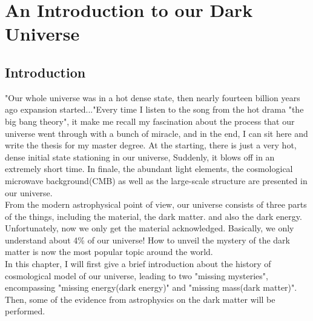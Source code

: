 \chapter{An Introduction to our Dark Universe}

\section{Introduction}
"Our whole universe was in a hot dense state,
then nearly fourteen billion years ago expansion started..."Every time I listen to the song from the hot drama "the big bang theory", it make me recall my fascination about the process that our universe went through with a bunch of miracle, and in the end, I can sit here and write the thesis for my master degree. At the starting, there is just a very hot, dense initial state stationing in our universe, Suddenly, it blows off in an extremely short time. In finale, the abundant light elements, the cosmological microwave background(CMB) as well as the large-scale structure are presented in our universe.\\

From the modern astrophysical point of view, our universe consists of three parts of the things, including the material, the dark matter. and also the dark energy. Unfortunately, now we only get the material acknowledged. Basically, we only understand about 4\% of our universe! How to unveil the mystery of the dark matter is now the most popular topic around the world.\\

In this chapter, I will first give a brief introduction about the history of cosmological model of our universe, leading to two "missing mysteries", encompassing "missing energy(dark energy)" and "missing mass(dark matter)". Then, some of the evidence from astrophysics on the dark matter will be performed. \\


